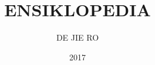 \documentclass[a5paper,11pt,twoside]{book}
\begin{document}
\title{ENSIKLOPEDIA}
\author{DE JIE RO}
\date{2017}

\maketitle




\end{document}
